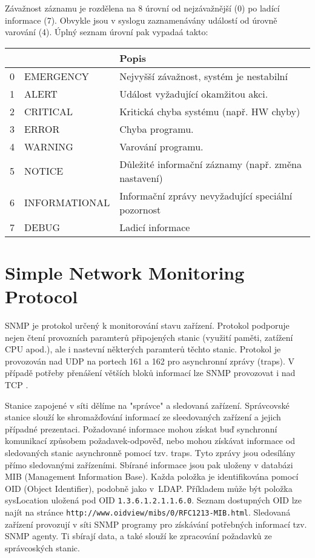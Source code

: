 Závažnost záznamu je rozdělena na 8 úrovní od nejzávažnější (0) po ladící informace (7). Obvykle
 jsou v syslogu zaznamenávány událostí od úrovně varování (4). Úplný seznam úrovní pak vypadaá takto:
\begin{table}[!h]
	\centering
	\begin{tabular}[!h]{|c|l|l|}
	\hline
	\shortstack{Závažnost} & & Popis \\
	\hline
	0 & EMERGENCY & Nejvyšší závažnost, systém je nestabilní\\
	1 & ALERT & Událost vyžadující okamžitou akci.\\
	2 & CRITICAL & Kritická chyba systému (např. HW chyby) \\
	3 & ERROR & Chyba programu.\\
	4 & WARNING & Varování programu.\\
	5 & NOTICE & Důležité informační záznamy (např. změna nastavení)\\
	6 & INFORMATIONAL & Informační zprávy nevyžadující speciální pozornost\\
	7 & DEBUG & Ladicí informace\\
	\hline
	\end{tabular}
\end{table}

\section{Simple Network Monitoring Protocol}
SNMP \cite{rfc1157} je protokol určený k monitorování stavu zařízení. Protokol podporuje nejen čtení
 provozních paramterů připojených stanic (využití paměti, zatížení CPU apod.), ale i nastevní
 některých paramterů těchto stanic.
Protokol je provozován nad UDP na portech 161 a 162 pro asynchronní zprávy (traps). V případě
 potřeby přenášení větších bloků informací lze SNMP provozovat i nad TCP \cite{rfc3430}.

Stanice zapojené v síti dělíme na "správce" a sledovaná zařízení. Správcovské stanice slouží
 ke shromažďování informací ze sleedovaných zařízení a jejich případné prezentaci.
Požadované informace mohou získat buď synchronní komunikací způsobem požadavek-odpověď, nebo mohou
 získávat informace od sledovaných stanic asynchronně pomocí tzv. traps. Tyto zprávy jsou odesílány
 přímo sledovanými zařízeními. Sbírané informace jsou pak uloženy v databázi MIB
 (Management Information Base). Každa položka je identifikována pomocí OID (Object Identifier),
 podobně jako v~LDAP. Příkladem může být položka sysLocation uložená pod OID {\tt 1.3.6.1.2.1.1.6.0}.
 Seznam dostupných OID lze najít na stránce {\tt http://www.oidview/mibs/0/RFC1213-MIB.html}.
Sledovaná zařízení provozují v síti SNMP programy pro získávání potřebných informací tzv. SNMP agenty.
 Ti sbírají data, a také slouží ke zpracování požadavků ze správcoských stanic.

